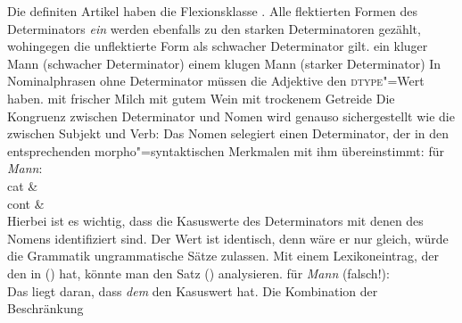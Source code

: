 Die definiten Artikel haben die Flexionsklasse . Alle flektierten Formen
des Determinators \emph{ein} werden ebenfalls zu den starken Determinatoren gezählt,
wohingegen die unflektierte Form als schwacher Determinator gilt.
\eal
\ex ein kluger Mann   (schwacher Determinator)
\ex einem klugen Mann (starker Determinator)
\zl
In Nominalphrasen ohne Determinator müssen die Adjektive den \textsc{dtype}"=Wert  haben.
\eal
\ex mit frischer Milch
\ex mit gutem Wein
\ex mit trockenem Getreide
\zl
Die Kongruenz zwischen Determinator und Nomen wird genauso sichergestellt wie die zwischen Subjekt und Verb:
Das Nomen selegiert einen Determinator, der in den entsprechenden morpho"=syntaktischen Merkmalen
mit ihm übereinstimmt:
\eas
\label{le-mann}%
\localw für \emph{Mann}:\\
\ms
{ cat &  \\
  cont &  \\
}
\zs
Hierbei ist es wichtig, dass die Kasuswerte des Determinators mit denen des Nomens
identifiziert sind. Der Wert ist identisch, denn wäre er nur gleich, würde die Grammatik
ungrammatische Sätze zulassen. Mit einem Lexikoneintrag, der den \catw in () hat,
könnte man den Satz () analysieren.
\ea
\catw für \emph{Mann} (falsch!):\\
\z
{}
\z
Das liegt daran, dass \emph{dem} den Kasuswert  hat. Die Kombination der Beschränkung
